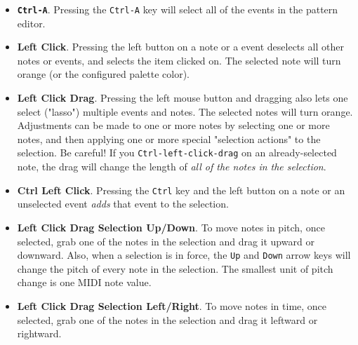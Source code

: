    \begin{itemize}
      \item
         \textbf{\texttt{Ctrl-A}}.
         Pressing the \texttt{Ctrl-A} key will select all of the events in the
         pattern editor.
      \item
         \textbf{Left Click}.
         Pressing the left button on a note or a event deselects all other
         notes or events, and selects the item clicked on.
         The selected note will turn orange (or the configured palette color).
      \item
         \textbf{Left Click Drag}.
         Pressing the left mouse button and dragging also lets one
         select ("lasso") multiple events and notes.
         The selected notes will turn orange.
         Adjustments can be made to one or more notes by selecting one or more
         notes, and then applying one or more special
         "selection actions" to the selection.
         Be careful!  If you \texttt{Ctrl-left-click-drag}
         on an already-selected note,
         the drag will change the length of
         \textsl{all of the notes in the selection}.
      \item {}
         \textbf{Ctrl Left Click}.
         Pressing the \texttt{Ctrl} key and the left button on a note or an
         unselected event \textsl{adds} that event to the selection.
      \item
         \textbf{Left Click Drag Selection Up/Down}.
         To move notes in pitch, once selected, grab one of the notes in the
         selection and drag it upward or downward.
         Also, when a selection is in force, the
         \texttt{Up} and \texttt{Down} arrow keys will
         change the pitch of every note in the selection.
         The smallest unit of pitch change is one MIDI note value.
      \item
         \textbf{Left Click Drag Selection Left/Right}.
         To move notes in time, once selected, grab one of the notes in the
         selection and drag it leftward or rightward.

\end{itemize}
